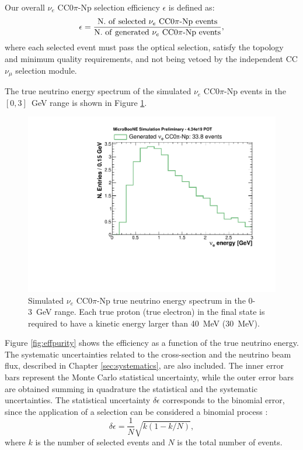Our overall $\nu_{e}$ CC$0\pi$-Np selection efficiency $\epsilon$ is defined as:
\begin{equation}
\epsilon = \frac{\mathrm{N.~of~selected~}\nu_{e}\mathrm{~CC0}\pi\mathrm{{\text -}Np~events}}{\mathrm{N.~of~generated~}\nu_{e}\mathrm{~CC0}\pi\mathrm{{\text -}Np~events}},
\end{equation}
where each selected event must pass the optical selection, satisfy the topology and minimum quality requirements, and not being vetoed by the independent CC $\nu_{\mu}$ selection module. %



The true neutrino energy spectrum of the simulated $\nu_{e}$ CC$0\pi$-Np events in the $[0,3]$~GeV range is shown in Figure \ref{fig:true_energy}.

\begin{figure}
\centering
  \includegraphics[width=0.8\linewidth]{figures/tot.pdf}
  \caption{Simulated $\nu_{e}$ CC$0\pi$-Np true neutrino energy spectrum in the 0-3~GeV range. Each true proton (true electron) in the final state is required to have a kinetic energy larger than 40~MeV (30~MeV).}
  \label{fig:true_energy}
\end{figure}

Figure \ref{fig:effpurity} shows the efficiency as a function of the true neutrino energy.
The systematic uncertainties related to the cross-section and the neutrino beam flux, described in Chapter \ref{sec:systematics}, are also included. The inner error bars represent the Monte Carlo statistical uncertainty, while the outer error bars are obtained summing in quadrature the statistical and the systematic uncertainties. The statistical uncertainty $\delta\epsilon$ corresponds to the binomial error, since the application of a selection can be considered a binomial process \cite{Paterno:2004cb}:
\begin{equation}
    \delta\epsilon = \frac{1}{N}\sqrt{k(1-k/N)},
\end{equation}
where $k$ is the number of selected events and $N$ is the total number of events.


